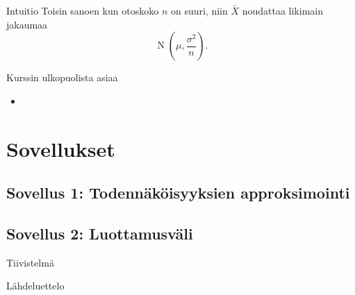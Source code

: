 \documentclass{beamer}
\DeclareMathOperator{\n}{\mathrm N}
\begin{document}


\begin{frame}{Intuitio}
  Toisin sanoen kun otoskoko $n$ on suuri, niin $\bar X$ noudattaa likimain
  jakaumaa
  \begin{equation*}
    \n\left(\mu, \frac{\sigma^2}{n}\right).
  \end{equation*}
\end{frame}


\begin{frame}{Kurssin ulkopuolista asiaa}
  \begin{itemize}
    \item 
  \end{itemize}
\end{frame}


\section{Sovellukset}

\subsection{Sovellus 1: Todennäköisyyksien approksimointi}

\subsection{Sovellus 2: Luottamusväli}

\begin{frame}{Tiivistelmä}
  
\end{frame}

\begin{frame}[allowframebreaks]{Lähdeluettelo}
  \printbibliography
\end{frame}
\end{document}
